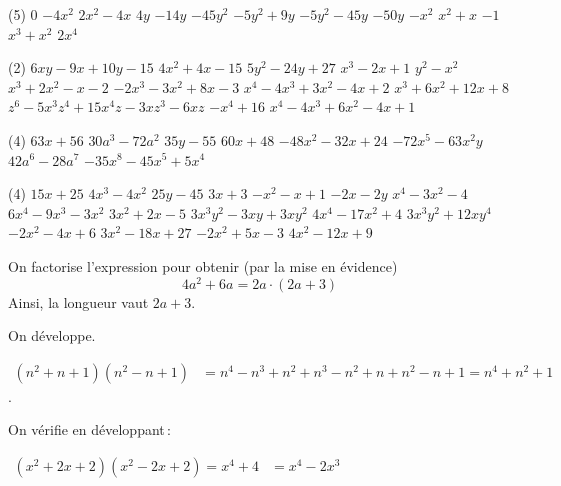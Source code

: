 \documentclass[a4paper,12pt]{report}
\begin{document}
\vspace*{-2\baselineskip}

\begin{core}
	\phantom{}
\begin{tasks}(5)
\task $0$
\task $-4x^2$
\task $2x^2 - 4x$
\task $4y$
\task $-14y$
\task $-45y^2$
\task $-5y^2 + 9y$
\task $-5y^2 - 45y$
\task $-50y$
\task $-x^2$
\task $x^2 + x$
\task $-1$
\task $x^3 + x^2$
\task $2x^4$
\end{tasks}
\end{core}

\begin{core}
	\phantom{}
\begin{tasks}(2)
\task $6xy - 9x + 10y - 15$
\task $4x^2 + 4x - 15$
\task $5y^2 - 24y + 27$
\task $x^3 - 2x + 1$
\task $y^2 - x^2$
\task $x^3 + 2x^2 - x - 2$
\task $-2x^3 - 3x^2 + 8x - 3$
\task $x^4 - 4x^3 + 3x^2 - 4x + 2$
\task $x^3 + 6x^2 + 12x + 8$
\task $z^6 - 5x^3z^4 + 15x^4z - 3xz^3 - 6xz$
\task $-x^4 + 16$
\task $x^4 - 4x^3 + 6x^2 - 4x + 1$
\end{tasks}
\end{core}

\begin{core}
	\phantom{}
\begin{tasks}(4)
\task $63x + 56$
\task $30a^3 - 72a^2$
\task $35y - 55$
\task $60x + 48$
\task $-48x^2 - 32x + 24$
\task $-72x^5 - 63x^2y$
\task $42a^6 - 28a^7$
\task $-35x^8 - 45x^5 + 5x^4$
\end{tasks}
\end{core}

\begin{core}
	\phantom{}
\begin{tasks}(4) 
\task $15x + 25$
\task $4x^3 - 4x^2$
\task $25y - 45$
\task $3x+3$
\task $-x^2-x+1$
\task $-2x - 2y$
\task $x^4 - 3x^2 - 4$
\task $6x^4 - 9x^3 - 3x^2$
\task $3x^2+ 2x-5$
\task $3x^3y^2 - 3xy + 3xy^2$
\task $4x^4 - 17x^2 + 4$
\task $3x^3y^2 + 12xy^4$
\task $-2x^2 - 4x + 6$
\task $3x^2 - 18x + 27$
\task $-2x^2 + 5x - 3$
\task $4x^2 - 12x + 9$
\end{tasks}
\end{core}
\begin{core}
\phantom{}
On factorise l'expression pour obtenir (par la mise en évidence) 
\[4a^2+6a=2a\cdot (2a+3)\]
Ainsi, la longueur vaut $2a+3$.
\end{core}
\begin{core}
On développe.

	$\begin{aligned}\left(n^2+n+1\right)\left(n^2-n+1\right)&=n^4-n^3+n^2+n^3-n^2+n+n^2-n+1=n^4+n^2+1
	\end{aligned}$. 
\end{core}
\begin{core}
	On vérifie en développant\,:

	$\begin{aligned}\left(x^2+2 x+2\right)\left(x^2-2 x+2\right)=x^4+4&=x^4-2x^3\\
	\end{aligned}$
\end{core}
\end{document}
